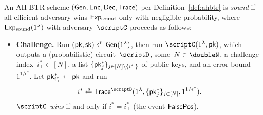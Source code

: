 \begin{definition}[soundness]\label{def:soundness}
An AH-BTR scheme $(\Gen,\Enc,\Dec,\Trace)$ per Definition~\ref{def:ahbtr} is \emph{sound}
if all efficient adversary wins $\ExpSound$ only with negligible probability,
where $\ExpSound(1^\lambda)$ with adversary~$\scriptC$ proceeds as follows:
\begin{itemize}\upshape
\item\textbf{Challenge.}
Run ${(\pk,\sk)\draws\Gen(1^\lambda)}$,
then run $\scriptC(1^\lambda,\pk)$, which outputs
a (probabilistic) circuit~$\scriptD$,
some~${N\in\doubleN}$,
a challenge index~${i_\bot^\ast\in[N]}$,
a list $\{\pk^\ast_j\}_{j\in[N]\setminus\{i_\bot^\ast\}}$ of public keys, and
an error bound~$1^{1/\epsilon^\ast}$.
Let ${\pk^\ast_{i_\bot^\ast}\gets\pk}$ and run
\begin{align*}
i^\ast\draws\Trace^\scriptD(1^\lambda,\{\pk^\ast_j\}_{j\in[N]},1^{1/\epsilon^\ast}).
\end{align*}
$\scriptC$ \emph{wins} if and only if ${i^\ast=i_\bot^\ast}$
(the event $\FalsePos$).
\end{itemize}
\end{definition}
